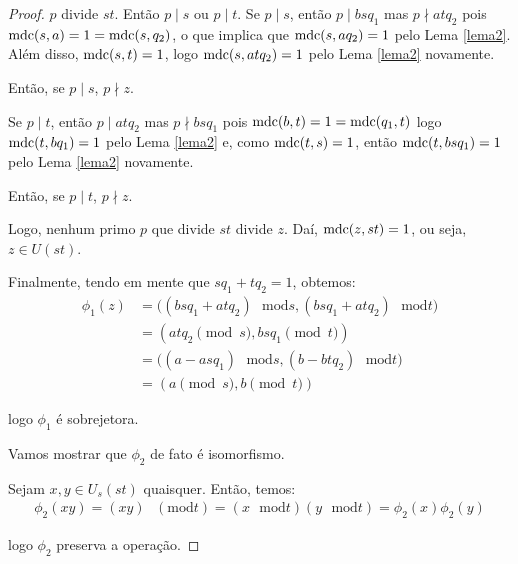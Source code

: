 \begin{proof}
		$p$ divide $st$. Então $p\mid s$ ou $p\mid t$. Se $p\mid s$, 
		então $p\mid bsq_1$ mas $p\nmid atq_2$ pois $\operatorname{mdc}(s,a) = 1 = \operatorname{mdc}(s,q_2)$,
		o que implica que $\operatorname{mdc}(s,aq_2) = 1$ pelo Lema \ref{lema2}. 
		Além disso, $\operatorname{mdc}(s,t) = 1$, logo $\operatorname{mdc}(s,atq_2) = 1$ pelo 
		Lema \ref{lema2} novamente.
		\par\vspace{0.3cm} Então, se $p\mid s$, $p\nmid z$.
		\par\vspace{0.3cm} Se $p\mid t$, então $p\mid atq_2$ mas 
		$p\nmid bsq_1$ pois $\operatorname{mdc}(b,t) = 1 = \operatorname{mdc}(q_1,t)$ logo 
		$\operatorname{mdc}(t,bq_1) = 1$ pelo Lema \ref{lema2} e, como $\operatorname{mdc}(t,s) = 1$,
		então $\operatorname{mdc}(t,bsq_1) = 1$ pelo Lema \ref{lema2} novamente.
		\par\vspace{0.3cm} Então, se $p\mid t$, $p\nmid z$. 
		\par\vspace{0.3cm} Logo, nenhum primo $p$ que divide $st$ divide $z$.
		Daí, $\operatorname{mdc}(z,st) = 1$, ou seja, $z\in U(st)$.
		\par\vspace{0.3cm} Finalmente, tendo em mente que $sq_1 + tq_2 = 1$,
		obtemos:
		\begin{align*}
		    \phi_1(z) 
		    &= 
		    \Big((bsq_1+atq_2)\text{ }\mathrm{mod} s,(bsq_1+atq_2)
		    \text{ }\mathrm{mod} t\Big) \\ 
		    &= ( atq_2\pmod s, bsq_1\pmod t) \\ 
		    &= \Big((a - asq_1)\text{ }\mathrm{mod} s , (b - btq_2)
		    \text{ }\mathrm{mod} t \Big) \\ 
		    &= (a\pmod s, b\pmod t)
		\end{align*}
		\par\vspace{0.3cm} logo $\phi_1$ é sobrejetora.
		\vspace{0.3cm}\par Vamos mostrar que $\phi_2$ de fato é isomorfismo.
		\par\vspace{0.3cm} Sejam $x, y\in U_s(st)$ quaisquer. Então, temos:
		\begin{align*}
		    \phi_2(xy) = 
		    (xy)\text{ }(\mathrm{mod}t)=(x\text{ }\mathrm{mod}t)(y\text{ }\mathrm{mod}t) 
		    = \phi_2(x)\phi_2(y)
		\end{align*}
		\par\vspace{0.3cm} logo $\phi_2$ preserva a operação.

\end{proof}
